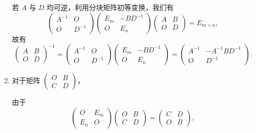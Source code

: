 \begin{exercise}
\begin{exgroup}
\begin{answer}
\begin{enumerate}
                    若 $A$ 与 $D$ 均可逆，利用分块矩阵初等变换，我们有
                    \[
                        \begin{pmatrix}
                            A^{-1} & O \\ O & D^{-1}
                        \end{pmatrix} \begin{pmatrix}
                            E_m & -BD^{-1} \\ O & E_n
                        \end{pmatrix} \begin{pmatrix}
                            A & B \\ O & D
                        \end{pmatrix} = E_{m+n},
                    \]
                    故有
                    \[
                        \begin{pmatrix}
                            A & B \\ O & D
                        \end{pmatrix}^{-1} = \begin{pmatrix}
                            A^{-1} & O \\ O & D^{-1}
                        \end{pmatrix} \begin{pmatrix}
                            E_m & -BD^{-1} \\ O & E_n
                        \end{pmatrix} = \begin{pmatrix}
                            A^{-1} & -A^{-1}BD^{-1} \\ O & D^{-1}
                        \end{pmatrix}.
                    \]

                \item 对于矩阵 $\begin{pmatrix}
                        O & B \\ C & D
                    \end{pmatrix}$，

                    由于
                    \[
                        \begin{pmatrix}
                            O & E_m \\ E_n & O
                        \end{pmatrix} \begin{pmatrix}
                            O & B \\ C & D
                        \end{pmatrix} = \begin{pmatrix}
                            C & D \\ O & B
                        \end{pmatrix},
                    \]


\end{enumerate}
\end{answer}
\end{exgroup}
\end{exercise}
